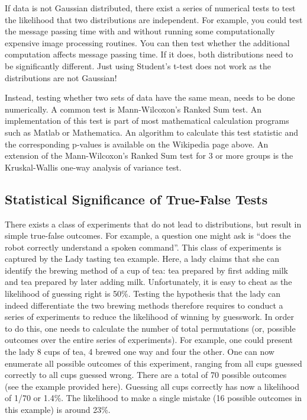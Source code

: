 If data is not Gaussian distributed, there exist a series of numerical tests to test the likelihood that two distributions are independent. For example, you could test the message passing time with and without running some computationally expensive image processing routines. You can then test whether the additional computation affects message passing time. If it does, both distributions need to be significantly different. Just using Student's t-test does not work as the distributions are not Gaussian!

Instead, testing whether two sets of data have the same mean, needs to be done numerically. A common test is Mann-Wilcoxon's Ranked Sum test. An implementation of this test is part of most mathematical calculation programs such as Matlab or Mathematica. An algorithm to calculate this test statistic and the corresponding p-values is available on the Wikipedia page above. An extension of the Mann-Wilcoxon's Ranked Sum test for 3 or more groups is the Kruskal-Wallis one-way analysis of variance test.

\subsection{Statistical Significance of True-False Tests}
There exists a class of experiments that do not lead to distributions, but result in simple true-false outcomes. For example, a question one might ask is ``does the robot correctly understand a spoken command''. This class of experiments is captured by the Lady tasting tea example. Here, a lady claims that she can identify the brewing method of a cup of tea: tea prepared by first adding milk and tea prepared by later adding milk. Unfortunately, it is easy to cheat as the likelihood of guessing right is 50\%. Testing the hypothesis that the lady can indeed differentiate the two brewing methods therefore requires to conduct a series of experiments to reduce the likelihood of winning by guesswork. In order to do this, one needs to calculate the number of total permutations (or, possible outcomes over the entire series of experiments). For example, one could present the lady 8 cups of tea, 4 brewed one way and four the other. One can now enumerate all possible outcomes of this experiment, ranging from all cups guessed correctly to all cups guessed wrong. There are a total of 70 possible outcomes (see the example provided here). Guessing all cups correctly has now a likelihood of 1/70 or 1.4\%. The likelihood to make a single mistake (16 possible outcomes in this example) is around 23\%.

